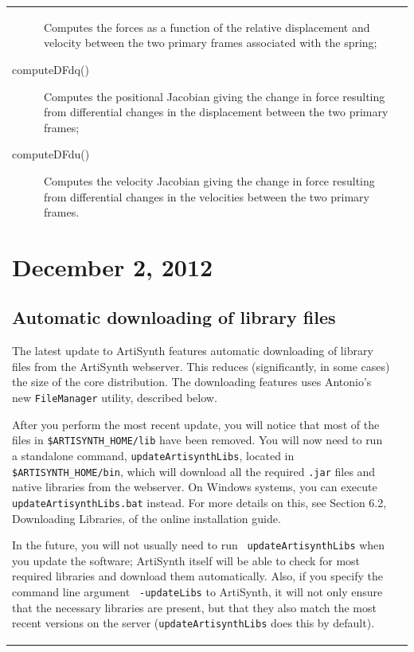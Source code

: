 \documentclass{article}
\begin{document}
\begin{tabular}{ll}
\begin{description}
Computes the forces as a function of the relative displacement and
velocity between the two primary frames associated with the spring;

\item[computeDFdq()] \mbox{}

Computes the positional Jacobian giving the change in force
resulting from differential changes in the displacement
between the two primary frames;

\item[computeDFdu()] \mbox{} 

Computes the velocity Jacobian giving the change in force resulting
from differential changes in the velocities between the two primary
frames.

\end{description}

\section*{December 2, 2012}

\subsection*{Automatic downloading of library files}

The latest update to ArtiSynth features automatic downloading of
library files from the ArtiSynth webserver. This reduces
(significantly, in some cases) the size of the core distribution.  The
downloading features uses Antonio's new {\tt FileManager} utility,
described below.

After you perform the most recent update, you will notice that most of
the files in {\tt \$ARTISYNTH\_HOME/lib} have been removed.  You will
now need to run a standalone command, {\tt updateArtisynthLibs},
located in {\tt \$ARTISYNTH\_HOME/bin}, which will download all the
required {\tt .jar} files and native libraries from the webserver. On
Windows systems, you can execute {\tt updateArtisynthLibs.bat}
instead. For more details on this, see Section 6.2, Downloading
Libraries, of the online installation guide.

In the future, you will not usually need to run {\tt
updateArtisynthLibs} when you update the software; ArtiSynth itself
will be able to check for most required libraries and download them
automatically. Also, if you specify the command line argument {\tt
-updateLibs} to ArtiSynth, it will not only ensure that the necessary
libraries are present, but that they also match the most recent
versions on the server ({\tt updateArtisynthLibs} does this by
default).


\end{tabular}
\end{document}
